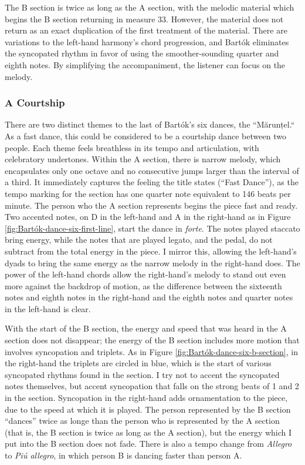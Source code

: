 The B section is twice as long as the A section, with the melodic material which begins the B section returning in measure 33. However, the material does not return as an exact duplication of the first treatment of the material. There are variations to the left-hand harmony's chord progression, and Bartók eliminates the syncopated rhythm in favor of using the smoother-sounding quarter and eighth notes. By simplifying the accompaniment, the listener can focus on the melody.

\subsubsection{A Courtship}

There are two distinct themes to the last of Bartók's six dances, the ``Mărunțel.`` As a fast dance, this could be considered to be a courtship dance between two people. Each theme feels breathless in its tempo and articulation, with celebratory undertones. Within the A section, there is narrow melody, which encapsulates only one octave and no consecutive jumps larger than the interval of a third. It immediately captures the feeling the title states (``Fast Dance''), as the tempo marking for the section has one quarter note equivalent to 146 beats per minute. The person who the A section represents begins the piece fast and ready. Two accented notes, on D in the left-hand and A in the right-hand as in Figure \ref{fig:Bartók-dance-six-first-line}\autocite{Lung_2016}, start the dance in \textit{forte}. The notes played staccato bring energy, while the notes that are played legato, and the pedal, do not subtract from the total energy in the piece. I mirror this, allowing the left-hand's dyads to bring the same energy as the narrow melody in the right-hand does. The power of the left-hand chords allow the right-hand's melody to stand out even more against the backdrop of motion, as the difference between the sixteenth notes and eighth notes in the right-hand and the eighth notes and quarter notes in the left-hand is clear. 

With the start of the B section, the energy and speed that was heard in the A section does not disappear; the energy of the B section includes more motion that involves syncopation and triplets. As in Figure \ref{fig:Bartók-dance-six-b-section}\autocite{Lung_2016}, in the right-hand the triplets are circled in blue, which is the start of various syncopated rhythms found in the section. I try not to accent the syncopated notes themselves, but accent syncopation that falls on the strong beats of 1 and 2 in the section. Syncopation in the right-hand adds ornamentation to the piece, due to the speed at which it is played. The person represented by the B section ``dances'' twice as longe than the person who is represented by the A section (that is, the B section is twice as long as the A section), but the energy which I put into the B section does not fade. There is also a tempo change from \textit{Allegro} to \textit{Piú allegro}, in which person B is dancing faster than person A.
